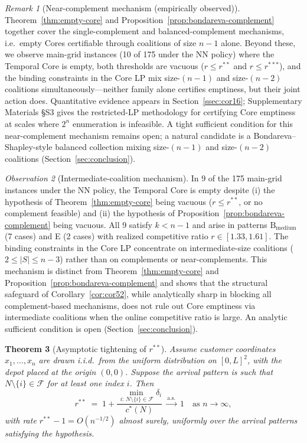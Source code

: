 \documentclass[11pt]{article}
\theoremstyle{plain}
\newtheorem{theorem}{Theorem}
\theoremstyle{definition}
\theoremstyle{remark}
\newtheorem{remark}[theorem]{Remark}
\newtheorem{observation}[theorem]{Observation}
\newcommand{\F}{\mathcal{F}}
\newcommand{\cstar}{c^{\ast}}
\begin{document}
\begin{remark}[Near-complement mechanism (empirically observed)]
\label{rem:near-complement}
Theorem~\ref{thm:empty-core} and Proposition~\ref{prop:bondareva-complement} together cover the single-complement and balanced-complement mechanisms, i.e.\ empty Cores certifiable through coalitions of size $n-1$ alone. Beyond these, we observe main-grid instances (10 of 175 under the NN policy) where the Temporal Core is empty, both thresholds are vacuous ($r\le r^{\ast\ast}$ and $r\le r^{\ast\ast\ast}$), and the binding constraints in the Core LP mix size-$(n-1)$ and size-$(n-2)$ coalitions simultaneously---neither family alone certifies emptiness, but their joint action does. Quantitative evidence appears in Section~\ref{ssec:cor16}; Supplementary Materials \S S3 gives the restricted-LP methodology for certifying Core emptiness at scales where $2^n$ enumeration is infeasible. A tight sufficient condition for this near-complement mechanism remains open; a natural candidate is a Bondareva--Shapley-style balanced collection mixing size-$(n-1)$ and size-$(n-2)$ coalitions (Section~\ref{sec:conclusion}).
\end{remark}

\begin{observation}[Intermediate-coalition mechanism]
\label{obs:intermediate}
In 9 of the 175 main-grid instances under the NN policy, the Temporal Core is empty despite (i) the hypothesis of Theorem~\ref{thm:empty-core} being vacuous ($r\le r^{\ast\ast}$, or no complement feasible) and (ii) the hypothesis of Proposition~\ref{prop:bondareva-complement} being vacuous. All 9 satisfy $k<n-1$ and arise in patterns $\text{B}_{\text{medium}}$ (7 cases) and E (2 cases) with realized competitive ratio $r\in[1.33,1.61]$. The binding constraints in the Core LP concentrate on intermediate-size coalitions ($2\le |S|\le n-3$) rather than on complements or near-complements. This mechanism is distinct from Theorem~\ref{thm:empty-core} and Proposition~\ref{prop:bondareva-complement} and shows that the structural safeguard of Corollary~\ref{cor:cor52}, while analytically sharp in blocking all complement-based mechanisms, does not rule out Core emptiness via intermediate coalitions when the online competitive ratio is large. An analytic sufficient condition is open (Section~\ref{sec:conclusion}).
\end{observation}

\begin{theorem}[Asymptotic tightening of $r^{\ast\ast}$]
\label{thm:asymptotic}
Assume customer coordinates $x_1,\ldots,x_n$ are drawn i.i.d.\ from the uniform distribution on $[0,L]^2$, with the depot placed at the origin $(0,0)$. Suppose the arrival pattern is such that $N\setminus\{i\}\in\F$ for at least one index $i$. Then
\[
r^{\ast\ast} \;=\; 1 + \frac{\min_{\,i:\,N\setminus\{i\}\in\F} \delta_i}{\cstar(N)}\;\xrightarrow{\text{a.s.}}\; 1 \quad \text{as } n\to\infty,
\]
with rate $r^{\ast\ast}-1 = O(n^{-1/2})$ almost surely, uniformly over the arrival patterns satisfying the hypothesis.
\end{theorem}
\end{document}
